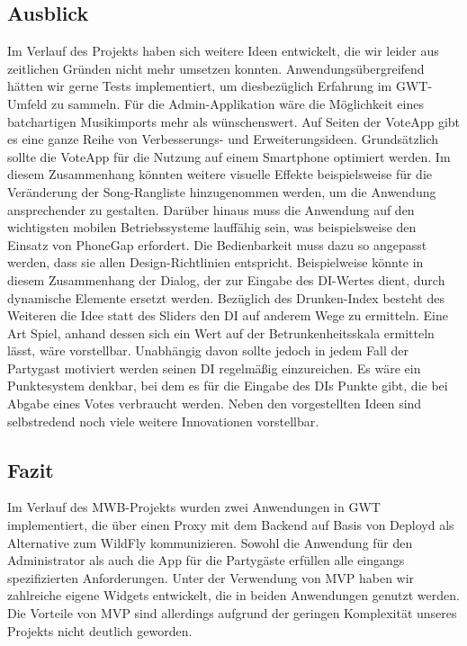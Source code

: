 \subsection{Ausblick}
Im Verlauf des Projekts haben sich weitere Ideen entwickelt, die wir leider aus zeitlichen Gründen nicht mehr umsetzen konnten. Anwendungsübergreifend hätten wir gerne Tests implementiert, um diesbezüglich Erfahrung im GWT-Umfeld zu sammeln. Für die Admin-Applikation wäre die Möglichkeit eines batchartigen Musikimports mehr als wünschenswert. Auf Seiten der VoteApp gibt es eine ganze Reihe von Verbesserungs- und Erweiterungsideen. Grundsätzlich sollte die VoteApp für die Nutzung auf einem Smartphone optimiert werden. Im diesem Zusammenhang könnten weitere visuelle Effekte beispielsweise für die Veränderung der Song-Rangliste hinzugenommen werden, um die Anwendung ansprechender zu gestalten. Darüber hinaus muss die Anwendung auf den wichtigsten mobilen Betriebssysteme lauffähig sein, was beispielsweise den Einsatz von PhoneGap erfordert. Die Bedienbarkeit muss dazu so angepasst werden, dass sie allen Design-Richtlinien entspricht. Beispielweise könnte in diesem Zusammenhang der Dialog, der zur Eingabe des DI-Wertes dient, durch dynamische Elemente ersetzt werden. Bezüglich des Drunken-Index besteht des Weiteren die Idee statt des Sliders den DI auf anderem Wege zu ermitteln. Eine Art Spiel, anhand dessen sich ein Wert auf der Betrunkenheitsskala ermitteln lässt, wäre vorstellbar. Unabhängig davon sollte jedoch in jedem Fall der Partygast motiviert werden seinen DI regelmäßig einzureichen. Es wäre ein Punktesystem denkbar, bei dem es für die Eingabe des DIs Punkte gibt, die bei Abgabe eines Votes verbraucht werden. Neben den vorgestellten Ideen sind selbstredend noch viele weitere Innovationen vorstellbar.

\subsection{Fazit}
Im Verlauf des MWB-Projekts wurden zwei Anwendungen in GWT implementiert, die über einen Proxy mit dem Backend auf Basis von Deployd als Alternative zum WildFly kommunizieren. Sowohl die Anwendung für den Administrator als auch die App für die Partygäste erfüllen alle eingangs spezifizierten Anforderungen. Unter der Verwendung von MVP haben wir zahlreiche eigene Widgets entwickelt, die in beiden Anwendungen genutzt werden. Die Vorteile von MVP sind allerdings aufgrund der geringen Komplexität unseres Projekts nicht deutlich geworden. 


